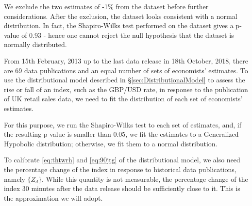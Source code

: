 \documentclass[a4paper,11pt,pdftex,twoside,titlepage]{article}
\begin{document}
We exclude the two estimates of -1\% from the dataset before further
considerations. After the exclusion, the dataset looks consistent with
a normal distribution. In fact, the Shapiro-Wilks test performed on
the dataset gives a p-value of 0.93 - hence one cannot reject the null
hypothesis that the dataset is normally distributed.

From 15th February, 2013 up to the last data release in 18th October,
2018, there are 69 data publications and an equal number of sets of
economists' estimates. To use the distributional model described in
\S\ref{sec:DistributionalModel} to assess the rise or fall of an
index, such as the GBP/USD rate, in response to the publication of UK
retail sales data, we need to fit the distribution of each set of
economists' estimates.

For this purpose, we run the Shapiro-Wilks test to each set of
estimates, and, if the resulting p-value is smaller than 0.05, we fit
the estimates to a Generalized Hypobolic distribution; otherwise, we
fit them to a normal distribution.

To calibrate \eqref{eq:thtwrh} and \eqref{eq:90jtg} of the
distributional model, we also need the percentage change of the index
in response to historical data publications, namely $\{Z_d\}$. While
this quantity is not measurable, the percentage change of the index 30
minutes after the data release should be sufficiently close to
it. This is the approximation we will adopt.
\end{document}
